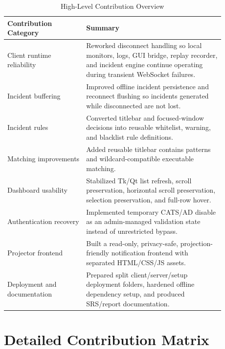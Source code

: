 \documentclass[conference]{IEEEtran}
\begin{document}
\begin{table}[htbp]
\caption{High-Level Contribution Overview}
\centering
\begin{tabular}{P{0.32\linewidth} P{0.56\linewidth}}
\toprule
\textbf{Contribution Category} & \textbf{Summary} \\
\midrule
Client runtime reliability & Reworked disconnect handling so local monitors, logs, GUI bridge, replay recorder, and incident engine continue operating during transient WebSocket failures. \\
Incident buffering & Improved offline incident persistence and reconnect flushing so incidents generated while disconnected are not lost. \\
Incident rules & Converted titlebar and focused-window decisions into reusable whitelist, warning, and blacklist rule definitions. \\
Matching improvements & Added reusable titlebar contains patterns and wildcard-compatible executable matching. \\
Dashboard usability & Stabilized Tk/Qt list refresh, scroll preservation, horizontal scroll preservation, selection preservation, and full-row hover. \\
Authentication recovery & Implemented temporary CATS/AD disable as an admin-managed validation state instead of unrestricted bypass. \\
Projector frontend & Built a read-only, privacy-safe, projection-friendly notification frontend with separated HTML/CSS/JS assets. \\
Deployment and documentation & Prepared split client/server/setup deployment folders, hardened offline dependency setup, and produced SRS/report documentation. \\
\bottomrule
\end{tabular}
\label{tab:overview}
\end{table}

\section{Detailed Contribution Matrix}
\end{document}
